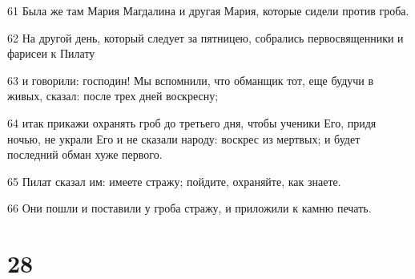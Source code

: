 \par 61 Была же там Мария Магдалина и другая Мария, которые сидели против гроба.
\par 62 На другой день, который следует за пятницею, собрались первосвященники и фарисеи к Пилату
\par 63 и говорили: господин! Мы вспомнили, что обманщик тот, еще будучи в живых, сказал: после трех дней воскресну;
\par 64 итак прикажи охранять гроб до третьего дня, чтобы ученики Его, придя ночью, не украли Его и не сказали народу: воскрес из мертвых; и будет последний обман хуже первого.
\par 65 Пилат сказал им: имеете стражу; пойдите, охраняйте, как знаете.
\par 66 Они пошли и поставили у гроба стражу, и приложили к камню печать.

\chapter{28}

